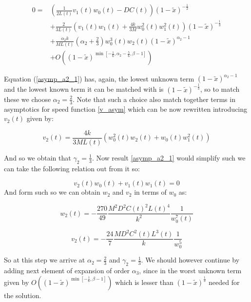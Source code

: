 \begin{equation}
\begin{split}0= & \left(\frac{1}{2L(t)}v_{1}(t)w_{0}(t)-DC(t)\right)(1-\tilde{x})^{-\frac{1}{2}}\\
 & +\frac{2}{3L(t)}\left(v_{1}(t)w_{1}(t)+\frac{4k}{3M}w_{0}^{2}(t)w_{1}^{2}(t)\right)(1-\tilde{x})^{-\frac{1}{3}}\\
 & +\frac{\alpha_{2}k}{ML(t)}\left(\alpha_{2}+\frac{2}{3}\right)w_{0}^{3}(t)w_{2}(t)(1-\tilde{x})^{\alpha_{2}-1}\\
 & +O\left((1-\tilde{x})^{\min{[-\frac{1}{6},\alpha_{2}-\frac{5}{6},\beta-1]}}\right)
\end{split}
\label{asymp_a2_1}
\end{equation}

Equation (\ref{asymp_a2_1}) has, again,  the lowest unknown term $(1-\tilde{x})^{\alpha_{2}-1}$ and the lowest known term it can be matched with is $(1-\tilde{x})^{-\frac{1}{3}}$, so to match these we choose $\alpha_{2}=\frac{2}{3}$. Note that
such a choice also match together terms in asymptotics for speed function \eqref{v_asym} which can be now rewritten introducing $v_{2}(t)$
given by: 

\begin{equation}
v_{2}(t)=\frac{4k}{3ML(t)}\left(w_{0}^{2}(t)w_{2}(t)+w_{0}(t)w_{1}^{2}(t)\right)\label{v_2}
\end{equation}

And so we obtain that $\gamma_{2}=\frac{1}{3}$. Now result \eqref{asymp_a2_1} would simplify such we can take the following relation out from it so:

\begin{equation}
v_{2}(t)w_{0}(t)+v_{1}(t)w_{1}(t)=0\label{relation_2}
\end{equation}
And form such so we can obtain $w_2$ and $v_2$ in terms of $w_0$ as:

\begin{equation}
w_{2}(t)=-\frac{270}{49}\frac{M^2D^2C(t)^2L(t)^4}{k^2}\frac{1}{w_{0}^{7}(t)}\label{w_2}
\end{equation}

\begin{equation}
v_{2}(t)=-\frac{24}{7}\frac{MD^{2}C^{2}(t)L^3(t)}{k}\frac{1}{w_{0}^{5}}\label{v_2}
\end{equation}

So at this step we arrive at $\alpha_{2}=\frac{2}{3}$ and $\gamma_{2}=\frac{1}{3}$. We should however continue by adding next element of expansion of order $\alpha_{3}$,
since in the worst unknown term given by $O\left((1-\tilde{x})^{\min{[-\frac{1}{6},\beta-1]}}\right)$
which is lesser than $(1-\tilde{x})^{\frac{1}{3}}$ needed for the
solution.

